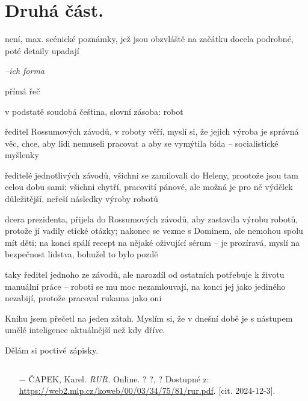 \documentclass{article}
\begin{document}
\section{Druhá část.}
\begin{description}
    \setlength\itemsep{0.15em}
    \item[vypravěč:] není, max. scénické poznámky, jež jsou obzvláště na začátku docela podrobné, poté detaily upadají
    \item[vyprávěcí způsoby:] \textit{--ich forma}
    \item[typy promluv:] přímá řeč
    \item[jazyková stránka:] v podstatě soudobá čeština, slovní zásoba: robot
    \item[postavy:]
        \begin{description}
            \setlength\itemsep{0.15em}
           	\item[Domin,] ředitel Rossumových závodů, v roboty věří, myslí si, že jejich výroba je správná věc, chce, aby
            lidi nemuseli pracovat a aby se vymýtila bída -- socialistické myšlenky
           	\item[Fabry, Gall, Hallmeier, Busman] ředitelé jednotlivých závodů, všichni se zamilovali do
            Heleny, prootože jsou tam celou dobu sami; všichni chytří, pracovití pánové, ale možná je pro
            ně výdělek důležitější, neřeší následky výroby robotů
           	\item[Helena,] dcera prezidenta, přijela do Rossumových závodů, aby zastavila výrobu robotů, protože
            jí vadily etické otázky; nakonec se vezme s Dominem, ale nemohou spolu mít děti; na konci spálí recept
            na nějaké oživující sérum -- je prozíravá, myslí na bezpečnost lidstva, bohužel to bylo pozdě
           	\item[stavitel Alquist,] taky ředitel jednoho ze závodů, ale narozdíl od ostatních potřebuje k životu
            manuální práce -- roboti se mu moc nezamlouvají, na konci jej jako jediného nezabijí, protože pracoval rukama jako oni
        \end{description}
    \item[názor:] Knihu jsem přečetl na jeden zátah. Myslím si, že v dnešní době je s
    nástupem umělé inteligence aktuálnější než kdy dříve.
    \item[kontext:]  Dělám si poctivé zápisky.
    \item[zdroje:] $ $
    \begin{itemize}
        \setlength\itemsep{0em}
        \item[$-$] ČAPEK, Karel. \textit{RUR.} Online. ? ?, ? Dostupné z: \url{https://web2.mlp.cz/koweb/00/03/34/75/81/rur.pdf}. [cit. 2024-12-3].
    \end{itemize}
\end{description}
\end{document}
